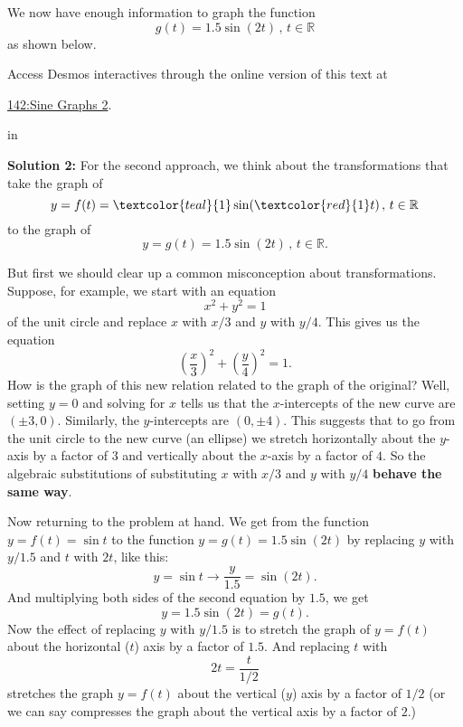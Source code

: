 \documentclass{ximera}
\newcommand{\pskip}{\vskip 0.1 in}
\begin{document}
\begin{example}
We now have enough information to graph the function 
\[
    g(t) = 1.5 \sin (2t) \, , \, t \in \mathbb{R} 
\]
as shown below.

Access Desmos interactives through the online version of this text at
 
\href{https://www.desmos.com/calculator/txuiehcciu}{142:Sine Graphs 2}.

 
\begin{onlineOnly}
    \begin{center}
\end{center}
\end{onlineOnly}

\pskip

{\bf Solution 2:} For the second approach, we think about the transformations that take the graph of 
\[
      y = f(t) = \textcolor{teal}{1} \sin (\textcolor{red}{1}t) \, , \, t\in \mathbb{R}
\]
to the graph of
\[
  y = g(t) = 1.5 \sin (2t) \, , \, t\in \mathbb{R} .
\]

But first we should clear up a common misconception about transformations. Suppose, for example, we start with an equation 
\[
   x^2 + y^2 = 1
\]
of the unit circle and replace $x$ with $x/3$ and $y$ with $y/4$. This gives us the equation
\[
    \left( \frac{x}{3} \right)^2 + \left( \frac{y}{4} \right)^2 = 1 .
\]
How is the graph of this new relation related to the graph of the original? Well, setting $y=0$ and solving for $x$ tells us that the $x$-intercepts of the new curve are $(\pm 3, 0)$. Similarly, the $y$-intercepts are $(0,\pm 4)$. This suggests that to go from the unit circle to the new curve (an ellipse) we stretch horizontally about the $y$-axis by a factor of $3$ and vertically about the $x$-axis by a factor of $4$. So the algebraic substitutions of substituting $x$ with $x/3$ and $y$ with $y/4$ {\bf behave the same way}.


Now returning to the problem at hand. We get from the function $y=f(t) = \sin t$ to the function $y=g(t) = 1.5 \sin (2t)$ by replacing $y$ with $y/1.5$ and $t$ with $2t$, like this: 
\[
   y = \sin t  \longrightarrow \frac{y}{1.5} = \sin (2t) .
\]
And multiplying both sides of the second equation by $1.5$, we get
\[
        y = 1.5 \sin (2t) = g(t) .
\]
Now the effect of replacing $y$ with $y/1.5$ is to stretch the graph of $y=f(t)$ about the horizontal ($t$) axis by a factor of $1.5$. And replacing $t$ with 
\[
   2t = \frac{t}{1/2}
\]
stretches the graph $y=f(t)$ about the vertical ($y$) axis by a factor of $1/2$ (or we can say compresses the graph about the vertical axis by a factor of $2$.)


\end{example}
\end{document}
